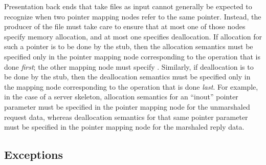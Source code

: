Presentation back ends that take \PRESC{} files as input cannot generally be
expected to recognize when two pointer mapping nodes refer to the same pointer.
Instead, the producer of the \PRESC{} file must take care to ensure that at
most one of those nodes specify memory allocation, and at most one specifies
deallocation.  If allocation for such a pointer is to be done by the stub, then
the allocation semantics must be specified only in the pointer mapping node
corresponding to the operation that is done \emph{first}; the other mapping
node must specify \@.  Similarly, if
deallocation is to be done by the stub, then the deallocation semantics must be
specified only in the mapping node corresponding to the operation that is done
\emph{last}.  For example, in the case of a server skeleton, allocation
semantics for an ``inout'' pointer parameter must be specified in the pointer
mapping node for the unmarshaled request data, whereas deallocation semantics
for that same pointer parameter must be specified in the pointer mapping node
for the marshaled reply data.








\subsection{Exceptions}
\label{subsec:PRESC:Exceptions}

